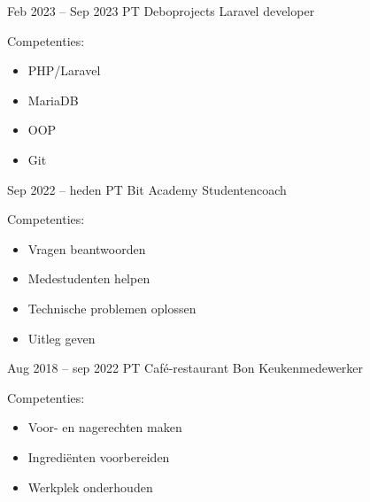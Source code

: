 \documentclass[
	11pt, %
]{FreemanCV}
\begin{document}
\begin{paracol}{2}
	\jobentry
	{Feb 2023 -- Sep 2023} %
	{PT} %
	{Deboprojects} %
	{Laravel developer} %
	{Competenties:
				\begin{itemize}
					\item PHP/Laravel
					\item MariaDB
					\item OOP
					\item Git
				\end{itemize}
			} %

	\jobentry
	{Sep 2022 -- heden} %
	{PT} %
	{Bit Academy} %
	{Studentencoach} %
	{Competenties:
		\begin{itemize}
			\item Vragen beantwoorden
			\item Medestudenten helpen
			\item Technische problemen oplossen
			\item Uitleg geven
		\end{itemize}
	} %

	\jobentry
	{Aug 2018 -- sep 2022} %
	{PT} %
	{Café-restaurant Bon} %
	{Keukenmedewerker} %
	{Competenties:
		\begin{itemize}
			\item Voor- en nagerechten maken
			\item Ingrediënten voorbereiden
			\item Werkplek onderhouden
		\end{itemize}
	} %







\end{paracol}
\end{document}
